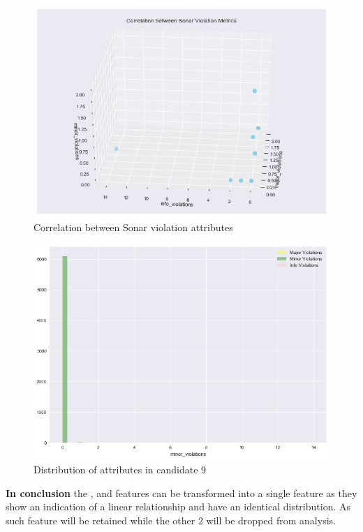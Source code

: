 \begin{enumerate}
\begin{figure}[!h]
    \centering
    \includegraphics[scale=0.6]{Figures/three-d/Correlation_between_attributes_major_violations_info_violations_minor_violations.png}
    \caption{Correlation between Sonar violation attributes}
    \label{fig:3d:candidate9-relationship}
\end{figure}

\begin{figure}
    \centering
    \includegraphics[scale=0.6]{Figures/correlation/Attribute_Distribution_in_Candidate_9.png}
    \caption{Distribution of attributes in candidate 9}
    \label{fig:candidate9-distribution}
\end{figure}

\textbf{In conclusion} the \openIssues{}, \codeSmells{} and \violations{} features can be transformed into a single feature as they show an indication of a linear relationship and have an identical distribution. As such \violations{} feature will be retained while the other 2 will be dropped from analysis.


\end{enumerate}

